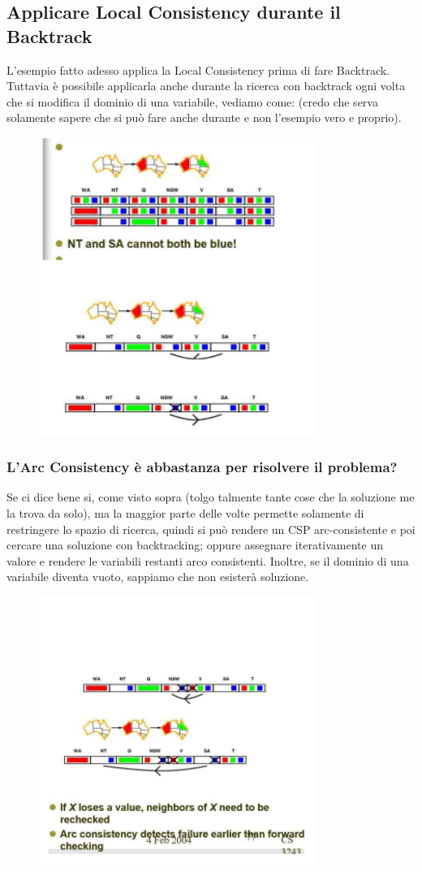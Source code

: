 \subsection{Applicare Local Consistency durante il Backtrack}
L’esempio fatto adesso applica la Local Consistency prima di fare Backtrack. Tuttavia è possibile applicarla anche durante la ricerca con backtrack ogni volta che si modifica il dominio di una variabile, vediamo come: (credo che serva solamente sapere che si può fare anche durante e non l’esempio vero e proprio).
\begin{figure}[htp]
	\centering
    \includegraphics[width=9cm, keepaspectratio]{img/Cap3/riassutno3.png}
\end{figure}
\newpage
\subsubsection{L’Arc Consistency è abbastanza per risolvere il problema?}
Se ci dice bene si, come visto sopra (tolgo talmente tante cose che la soluzione me la trova da solo), ma la maggior parte delle volte permette solamente di restringere lo spazio di ricerca, quindi si può rendere un CSP arc-consistente e poi cercare una soluzione con backtracking; oppure assegnare iterativamente un valore e rendere le variabili restanti arco consistenti. Inoltre, se il dominio
di una variabile diventa vuoto, sappiamo che non esisterà soluzione.
\begin{figure}[htp]
	\centering
    \includegraphics[width=9cm, keepaspectratio]{img/Cap3/riassunto4.png}
\end{figure}
